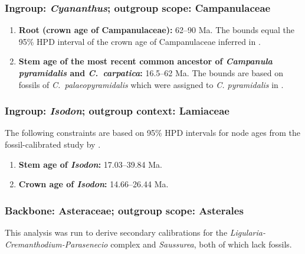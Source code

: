 \subsubsection*{Ingroup: \textit{Cyananthus}; outgroup scope:
  Campanulaceae}

\begin{enumerate}

\item \textbf{Root (crown age of Campanulaceae):} 62--90 Ma. The
  bounds equal the 95\% HPD interval of the crown age of Campanulaceae
  inferred in \cite{Magallon2015}.

\item \textbf{Stem age of the most recent common ancestor of
    \textit{Campanula pyramidalis} and \textit{C.~carpatica}:}
  16.5--62 Ma. The bounds are based on fossils of
  \textit{C.~palaeopyramidalis} \citep{Lancucka-Srodoniowa1979} which
  were assigned to \textit{C. pyramidalis} in \cite{Cellinese2009}.
\end{enumerate}

\subsubsection*{Ingroup: \textit{Isodon}; outgroup context: Lamiaceae}

The following constraints are based on 95\% HPD intervals for node
ages from the fossil-calibrated study by \citet{Yu2014}.

\begin{enumerate}
\item \textbf{Stem age of \textit{Isodon}:} 17.03--39.84 Ma.
\item \textbf{Crown age of \textit{Isodon}:} 14.66--26.44 Ma.
\end{enumerate}

\subsubsection*{Backbone: Asteraceae; outgroup scope: Asterales}

This analysis was run to derive secondary calibrations for the
\textit{Ligularia-Cremanthodium-Parasenecio} complex and
\textit{Saussurea}, both of which lack fossils.%


